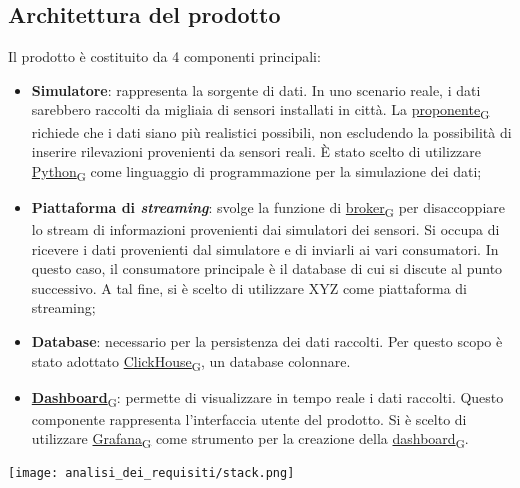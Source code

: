 \subsection{Architettura del prodotto}
Il prodotto è costituito da 4 componenti principali:
\begin{itemize}
	\item \textbf{Simulatore}: rappresenta la sorgente di dati. In uno scenario reale, i dati sarebbero raccolti da migliaia di sensori
	      installati in città. La \href{https://7last.github.io/docs/rtb/documentazione-interna/glossario\#proponente}{proponente\textsubscript{G}} richiede che i dati siano più realistici possibili, non escludendo la possibilità di inserire rilevazioni provenienti da sensori reali.
	      È stato scelto di utilizzare \href{https://7last.github.io/docs/rtb/documentazione-interna/glossario\#python}{Python\textsubscript{G}} come linguaggio di programmazione per la simulazione dei dati;
	\item \textbf{Piattaforma di \textit{streaming}}: svolge la funzione di \href{https://7last.github.io/docs/rtb/documentazione-interna/glossario\#broker}{broker\textsubscript{G}} per disaccoppiare lo stream di informazioni provenienti dai simulatori dei sensori.
	      Si occupa di ricevere i dati provenienti dal simulatore e di inviarli ai vari consumatori. In questo caso, il consumatore principale è il database
	      di cui si discute al punto successivo.
	      A tal fine, si è scelto di utilizzare XYZ come piattaforma di streaming; %
	\item \textbf{Database}: necessario per la persistenza dei dati raccolti. Per questo scopo è stato adottato \href{https://7last.github.io/docs/rtb/documentazione-interna/glossario\#clickhouse}{ClickHouse\textsubscript{G}}, un database colonnare.
	\item \href{https://7last.github.io/docs/rtb/documentazione-interna/glossario\#dashboard}{\textbf{Dashboard}\textsubscript{G}}: permette di visualizzare in tempo reale i dati raccolti. Questo componente rappresenta l'interfaccia utente del prodotto.
	      Si è scelto di utilizzare \href{https://7last.github.io/docs/rtb/documentazione-interna/glossario\#grafana}{Grafana\textsubscript{G}} come strumento per la creazione della \href{https://7last.github.io/docs/rtb/documentazione-interna/glossario\#dashboard}{dashboard\textsubscript{G}}.
\end{itemize}

\begin{center}
	\texttt{[image: analisi\_dei\_requisiti/stack.png]}
\end{center}

